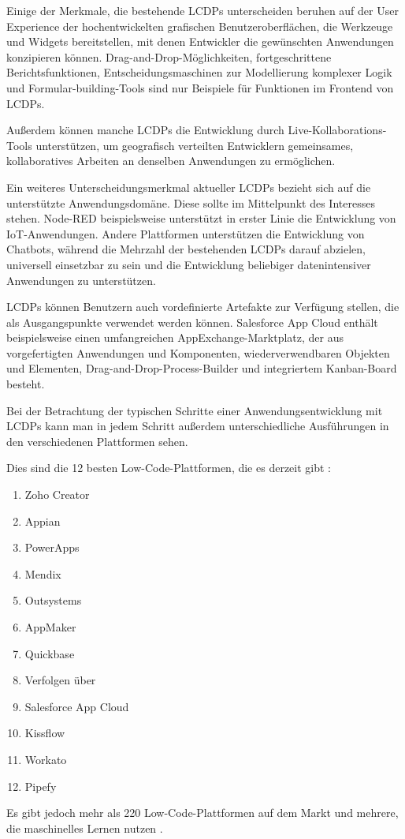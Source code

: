 \documentclass[12pt]{article} %
\begin{document}
	Einige der Merkmale, die bestehende LCDPs unterscheiden beruhen auf der User Experience der hochentwickelten grafischen Benutzeroberflächen, die Werkzeuge und Widgets bereitstellen, mit denen Entwickler die gewünschten Anwendungen konzipieren können. Drag-and-Drop-Möglichkeiten, fortgeschrittene Berichtsfunktionen, Entscheidungsmaschinen zur Modellierung komplexer Logik und Formular-building-Tools sind nur Beispiele für Funktionen im Frontend von LCDPs. \autocite{DiRuscio.2022}
	
	Außerdem können manche LCDPs die Entwicklung durch Live-Kollaborations-Tools unterstützen, um geografisch verteilten Entwicklern gemeinsames, kollaboratives Arbeiten an denselben Anwendungen zu ermöglichen. \autocite{DiRuscio.2022}
	
	Ein weiteres Unterscheidungsmerkmal aktueller LCDPs bezieht sich auf die unterstützte Anwendungsdomäne. Diese sollte im Mittelpunkt des Interesses stehen. Node-RED beispielsweise unterstützt in erster Linie die Entwicklung von IoT-Anwendungen. Andere Plattformen unterstützen die Entwicklung von Chatbots, während die Mehrzahl der bestehenden LCDPs darauf abzielen, universell einsetzbar zu sein und die Entwicklung beliebiger datenintensiver Anwendungen zu unterstützen. \autocite{DiRuscio.2022}
	
	LCDPs können Benutzern auch vordefinierte Artefakte zur Verfügung stellen, die als Ausgangspunkte verwendet werden können. Salesforce App Cloud enthält beispielsweise einen umfangreichen AppExchange-Marktplatz, der aus vorgefertigten Anwendungen und Komponenten, wiederverwendbaren Objekten und Elementen, Drag-and-Drop-Process-Builder und integriertem Kanban-Board besteht. \autocite{DiRuscio.2022}
	
	Bei der Betrachtung der typischen Schritte einer Anwendungsentwicklung mit LCDPs kann man in jedem Schritt außerdem unterschiedliche Ausführungen in den verschiedenen Plattformen sehen. \newline
	
	Dies sind die 12 besten Low-Code-Plattformen, die es derzeit gibt \autocite{KevinShuler.2023}: 
	\begin{enumerate}
	\item Zoho Creator
	\item Appian
	\item PowerApps
	\item Mendix
	\item Outsystems
	\item AppMaker
	\item Quickbase
	\item Verfolgen über
	\item Salesforce App Cloud
	\item Kissflow
	\item Workato
	\item Pipefy
	\end{enumerate}
	Es gibt jedoch mehr als 220 Low-Code-Plattformen auf dem Markt und mehrere, die maschinelles Lernen nutzen \autocite{KevinShuler.2023}. 
	
\end{document}
